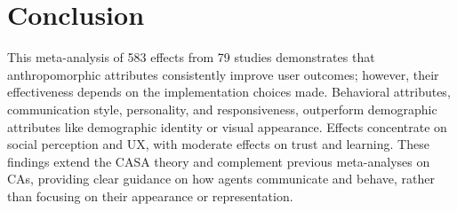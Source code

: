 \documentclass[manuscript,anonymous,sigconf]{acmart}
\begin{document}



\section{Conclusion}

This meta-analysis of 583 effects from 79 studies demonstrates that anthropomorphic attributes consistently improve user outcomes; however, their effectiveness depends on the implementation choices made. Behavioral attributes, communication style, personality, and responsiveness, outperform demographic attributes like demographic identity or visual appearance. Effects concentrate on social perception and UX, with moderate effects on trust and learning. These findings extend the CASA theory and complement previous meta-analyses on CAs, providing clear guidance on how agents communicate and behave, rather than focusing on their appearance or representation.



\end{document}
